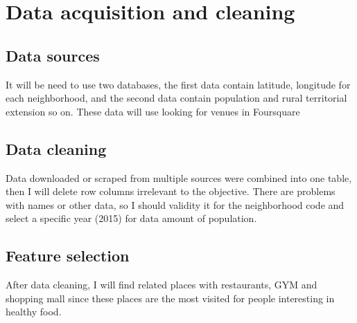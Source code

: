 {\justifying
	\chapter{Data acquisition and cleaning}
	\vspace{2.5cm}
	\section{Data sources}
	It will be need to use two databases, the first data contain latitude, longitude for each neighborhood, and the second data contain population and rural territorial extension so on. These data will use looking for venues in Foursquare
	\section{Data cleaning}
	Data downloaded or scraped from multiple sources were combined into one table, then I will delete row columns irrelevant to the objective. There are problems with names or other data, so I should validity it for the neighborhood code and select a specific year (2015) for data amount of population.
	\section{Feature selection}
	After data cleaning, I will find related places with restaurants, GYM and shopping mall since these places are the most visited for people interesting in healthy food.
}\cleanalldata